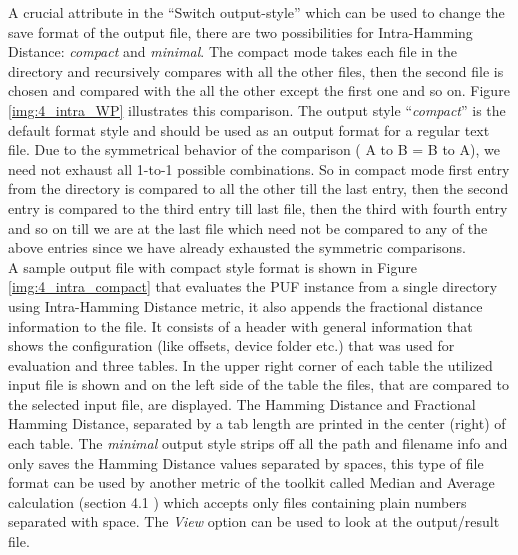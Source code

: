 A crucial attribute in the ``Switch output-style'' which can be used to change the save format of the output file, there are two possibilities for Intra-Hamming Distance: \emph{compact} and \emph{minimal}. The compact mode takes each file in the directory and recursively compares with all the other files, then the second file is chosen and compared with the all the other except the first one and so on. Figure \ref{img:4_intra_WP} illustrates this comparison.  The output style ``\emph{compact}'' is the default format style and should be used
as an output format for a regular text file. Due to the symmetrical behavior of the comparison ( A to B = B to A), we need not exhaust all 1-to-1 possible combinations. So in compact mode first entry from the directory is compared to all the other till the last entry, then the second entry is compared to the third entry till last file, then the third with fourth entry and so on till we are at the last file which need not be compared to any of the above entries since we have already exhausted the
symmetric comparisons.\\


A sample output file with compact style format is shown in Figure \ref{img:4_intra_compact} that evaluates the PUF instance from a single directory using Intra-Hamming Distance metric, it also appends the fractional distance information to the file. It consists of a header with general information that shows the configuration (like offsets, device folder etc.) that was used for evaluation and three tables. In the upper right corner of each table the utilized input file is shown and on the left side of the table
the files, that are compared to the selected input file, are displayed. The Hamming Distance and Fractional Hamming Distance, separated by a tab length are printed in the center (right) of each table. The
\emph{minimal} output style strips off all the path and filename info and only saves the Hamming Distance values separated by spaces, this type of file format can be used by another metric of the toolkit called Median and Average calculation (section 4.1 \cite{71}) which accepts only files containing plain numbers separated with space. The \emph{View} option can be used to look at the output/result file.\\


